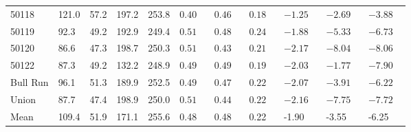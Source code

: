 \begin{tabular}{l p{1cm} p{1cm} p{1cm} p{1cm} p{1cm} p{1cm} p{1cm} p{1cm} p{1cm} p{1cm}}
50118 & 121.0 & 57.2 & 197.2 & 253.8 & $0.40\phantom{*}$ & $0.46\phantom{*}$ & $0.18\phantom{*}$ & $-1.25\phantom{*}$ & $-2.69\phantom{*}$ & $-3.88\phantom{*}$ \\
50119 & 92.3 & 49.2 & 192.9 & 249.4 & $0.51\phantom{*}$ & $0.48\phantom{*}$ & $0.24\phantom{*}$ & $-1.88\phantom{*}$ & $-5.33\phantom{*}$ & $-6.73\phantom{*}$ \\
50120 & 86.6 & 47.3 & 198.7 & 250.3 & $0.51\phantom{*}$ & $0.43\phantom{*}$ & $0.21\phantom{*}$ & $-2.17\phantom{*}$ & $-8.04\phantom{*}$ & $-8.06\phantom{*}$ \\
50122 & 87.3 & 49.2 & 132.2 & 248.9 & $0.49\phantom{*}$ & $0.49\phantom{*}$ & $0.19\phantom{*}$ & $-2.03\phantom{*}$ & $-1.77\phantom{*}$ & $-7.90\phantom{*}$ \\
Bull Run & 96.1 & 51.3 & 189.9 & 252.5 & $0.49\phantom{*}$ & $0.47\phantom{*}$ & $0.22\phantom{*}$ & $-2.07\phantom{*}$ & $-3.91\phantom{*}$ & $-6.22\phantom{*}$ \\
Union & 87.7 & 47.4 & 198.9 & 250.0 & $0.51\phantom{*}$ & $0.44\phantom{*}$ & $0.22\phantom{*}$ & $-2.16\phantom{*}$ & $-7.75\phantom{*}$ & $-7.72\phantom{*}$ \\
\hline
Mean & 109.4 & 51.9 & 171.1 & 255.6 & 0.48 & 0.48 & 0.22 & -1.90 & -3.55 & -6.25 \\
\end{tabular}
